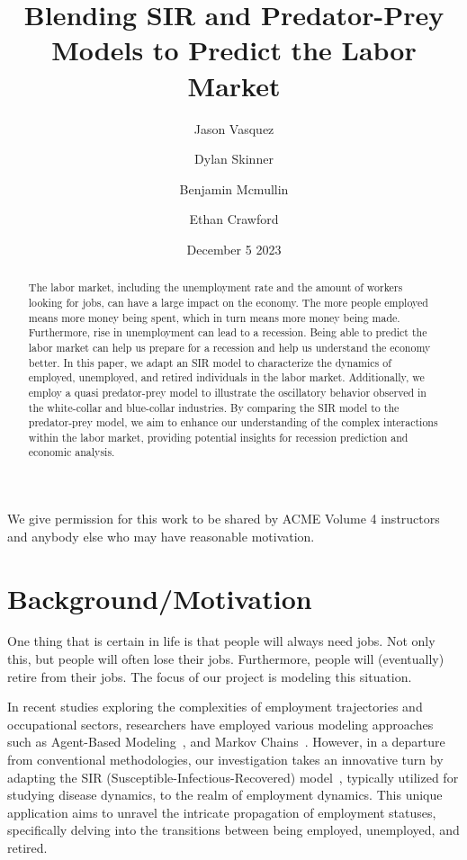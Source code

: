 \documentclass[11pt]{amsart}
\title{Blending SIR and Predator-Prey Models to Predict the Labor Market}
\author{Jason Vasquez \and Dylan Skinner \and Benjamin Mcmullin \and Ethan Crawford}
\date{December 5 2023}
\begin{document}
\begin{abstract}
    
    The labor market, including the unemployment rate and the amount of workers looking for jobs, can have a large impact on the economy.
    The more people employed means more money being spent, which in turn means more money being made. 
    Furthermore, rise in unemployment can lead to a recession. Being able to predict the labor market can help us prepare for a recession and help us understand the economy better.
    In this paper, we adapt an SIR model to characterize the dynamics of employed, unemployed, and retired individuals in the labor market. 
    Additionally, we employ a quasi predator-prey model to illustrate the oscillatory behavior observed in the white-collar and blue-collar industries. 
    By comparing the SIR model to the predator-prey model, we aim to enhance our understanding of the complex interactions within the labor market, 
    providing potential insights for recession prediction and economic analysis.
    
\end{abstract}

\maketitle

We give permission for this work to be shared by ACME Volume 4 instructors and anybody else who may have reasonable motivation.

\section{Background/Motivation}

One thing that is certain in life is that people will always need jobs. Not only this, but people 
will often lose their jobs. Furthermore, people will (eventually) retire from their jobs.
The focus of our project is modeling this situation.

In recent studies exploring the complexities of employment trajectories and occupational sectors, researchers 
have employed various modeling approaches such as Agent-Based Modeling~\cite{neves2019innovation}, and Markov Chains~\cite{zais2016markov}. However, 
in a departure from conventional methodologies, our investigation takes an innovative turn by adapting 
the SIR (Susceptible-Infectious-Recovered) model~\cite{kermack1927contribution}, typically utilized for studying disease dynamics, to the 
realm of employment dynamics. This unique application aims to unravel the intricate propagation of employment 
statuses, specifically delving into the transitions between being employed, unemployed, and retired.
\end{document}
